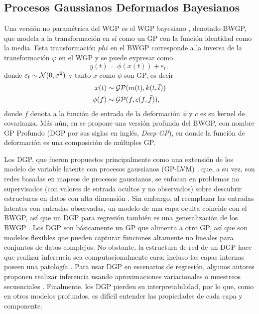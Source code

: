 \subsection{Procesos Gaussianos Deformados Bayesianos}

Una versión no paramétrica del WGP es el WGP bayesiano \cite{bayesianwarped12}, denotado BWGP, que modela a la transformación en sí como un GP con la función identidad como la media. Esta transformación \(phi\) en el BWGP corresponde a la inversa de la transformación \(\varphi\) en el WGP y se puede expresar como
\begin{equation*}
	y(t) = \phi(x(t)) + \varepsilon_{t},
\end{equation*}
donde \(\varepsilon_{t} \sim \mathcal{N}(0, \sigma^{2})\) y tanto \(x\) como \(\phi\) son GP, es decir
\begin{align*}
	x(t)	&\sim \operatorname{\mathcal{GP}}(m(t), k(t, \bar{t}))\\
	\phi(f)	&\sim \operatorname{\mathcal{GP}}(f, c(f, \bar{f})),
\end{align*}
donde \(f\) denota a la función de entrada de la deformación \(\phi\) y \(c\) es su kernel de covarianza. Más aún, en \cite{damianou2013deep} se propone una versión profunda del BWGP, con nombre GP Profundo (DGP por sus siglas en inglés, \emph{Deep GP}), en donde la función de deformación es una composición de múltiples GP.

Los DGP, que fueron propuestos principalmente como una extensión de los modelo de variable latente con procesos gaussianos (GP-LVM) \cite{titsias2010bayesian}, que, a su vez, son redes basadas en mapeos de procesos gaussianos, se enfocan en problemas no supervisados (con valores de entrada ocultos y no observados) sobre descubrir estructuras en datos con alta dimensión \cite{lawrence2004gaussian, li2016review, damianou2016variational}. Sin embargo, al reemplazar las entradas latentes con entradas observadas, un modelo de una capa oculta coincide con el BWGP, así que un DGP para regresión también es una generalización de los BWGP \cite{damianou2015deep}. Los DGP son básicamente un GP que alimenta a otro GP, así que son modelos flexibles que pueden capturar funciones altamente no lineales para conjuntos de datos complejos. No obstante, la estructura de red de un DGP hace que realizar inferencia sea computacionalmente cara; incluso las capas internas poseen una patología \cite{duvenaud2014avoiding}. Para usar DGP en escenarios de regresión, algunos autores proponen realizar inferencia usando aproximaciones variacionales \cite{bui2016deep, salimbeni2017doubly} o muestreos secuenciales \cite{wang2016sequential}. Finalmente, los DGP pierden su interpretabilidad, por lo que, como en otros modelos profundos, es difícil entender las propiedades de cada capa y componente.

